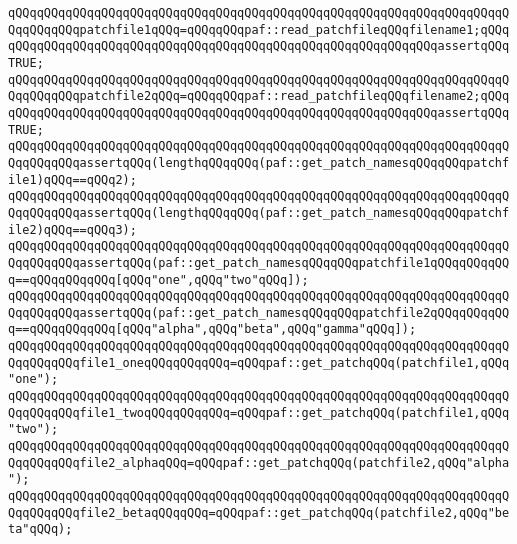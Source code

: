 \newline
\newline
\newline
\verb|qQQqqQQqqQQqqQQqqQQqqQQqqQQqqQQqqQQqqQQqqQQqqQQqqQQqqQQqqQQqqQQqqQQqqQQqqQQqqQQqpatchfile1qQQq=qQQqqQQqpaf::read_patchfileqQQqfilename1;qQQqqQQqqQQqqQQqqQQqqQQqqQQqqQQqqQQqqQQqqQQqqQQqqQQqqQQqqQQqqQQqassertqQQqTRUE;|\newline
\verb|qQQqqQQqqQQqqQQqqQQqqQQqqQQqqQQqqQQqqQQqqQQqqQQqqQQqqQQqqQQqqQQqqQQqqQQqqQQqqQQqpatchfile2qQQq=qQQqqQQqpaf::read_patchfileqQQqfilename2;qQQqqQQqqQQqqQQqqQQqqQQqqQQqqQQqqQQqqQQqqQQqqQQqqQQqqQQqqQQqqQQqassertqQQqTRUE;|\newline
\newline
\verb|qQQqqQQqqQQqqQQqqQQqqQQqqQQqqQQqqQQqqQQqqQQqqQQqqQQqqQQqqQQqqQQqqQQqqQQqqQQqqQQqassertqQQq(lengthqQQqqQQq(paf::get_patch_namesqQQqqQQqpatchfile1)qQQq==qQQq2);|\newline
\verb|qQQqqQQqqQQqqQQqqQQqqQQqqQQqqQQqqQQqqQQqqQQqqQQqqQQqqQQqqQQqqQQqqQQqqQQqqQQqqQQqassertqQQq(lengthqQQqqQQq(paf::get_patch_namesqQQqqQQqpatchfile2)qQQq==qQQq3);|\newline
\newline
\verb|qQQqqQQqqQQqqQQqqQQqqQQqqQQqqQQqqQQqqQQqqQQqqQQqqQQqqQQqqQQqqQQqqQQqqQQqqQQqqQQqassertqQQq(paf::get_patch_namesqQQqqQQqpatchfile1qQQqqQQqqQQq==qQQqqQQqqQQq[qQQq"one",qQQq"two"qQQq]);|\newline
\verb|qQQqqQQqqQQqqQQqqQQqqQQqqQQqqQQqqQQqqQQqqQQqqQQqqQQqqQQqqQQqqQQqqQQqqQQqqQQqqQQqassertqQQq(paf::get_patch_namesqQQqqQQqpatchfile2qQQqqQQqqQQq==qQQqqQQqqQQq[qQQq"alpha",qQQq"beta",qQQq"gamma"qQQq]);|\newline
\newline
\verb|qQQqqQQqqQQqqQQqqQQqqQQqqQQqqQQqqQQqqQQqqQQqqQQqqQQqqQQqqQQqqQQqqQQqqQQqqQQqqQQqfile1_oneqQQqqQQqqQQq=qQQqpaf::get_patchqQQq(patchfile1,qQQq"one");|\newline
\verb|qQQqqQQqqQQqqQQqqQQqqQQqqQQqqQQqqQQqqQQqqQQqqQQqqQQqqQQqqQQqqQQqqQQqqQQqqQQqqQQqfile1_twoqQQqqQQqqQQq=qQQqpaf::get_patchqQQq(patchfile1,qQQq"two");|\newline
\newline
\verb|qQQqqQQqqQQqqQQqqQQqqQQqqQQqqQQqqQQqqQQqqQQqqQQqqQQqqQQqqQQqqQQqqQQqqQQqqQQqqQQqfile2_alphaqQQq=qQQqpaf::get_patchqQQq(patchfile2,qQQq"alpha");|\newline
\verb|qQQqqQQqqQQqqQQqqQQqqQQqqQQqqQQqqQQqqQQqqQQqqQQqqQQqqQQqqQQqqQQqqQQqqQQqqQQqqQQqfile2_betaqQQqqQQq=qQQqpaf::get_patchqQQq(patchfile2,qQQq"beta"qQQq);|\newline
